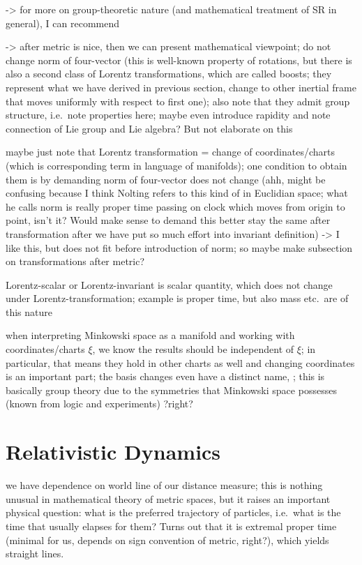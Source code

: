 -> for more on group-theoretic nature (and mathematical treatment of SR in general), I can recommend \cite{giulini_srt_indepth}



-> after metric is nice, then we can present mathematical viewpoint; do not change norm of four-vector (this is well-known property of rotations, but there is also a second class of Lorentz transformations, which are called boosts; they represent what we have derived in previous section, change to other inertial frame that moves uniformly with respect to first one); also note that they admit group structure, i.e.~note properties here; maybe even introduce rapidity and note connection of Lie group and Lie algebra? But not elaborate on this

maybe just note that Lorentz transformation = change of coordinates/charts (which is corresponding term in language of manifolds); one condition to obtain them is by demanding norm of four-vector does not change (ahh, might be confusing because I think Nolting refers to this kind of in Euclidian space; what he calls norm is really proper time passing on clock which moves from origin to point, isn't it? Would make sense to demand this better stay the same after transformation after we have put so much effort into invariant definition) -> I like this, but does not fit before introduction of norm; so maybe make subsection on transformations after metric?



Lorentz-scalar or Lorentz-invariant is scalar quantity, which does not change under Lorentz-transformation; example is proper time, but also mass etc.~are of this nature





when interpreting Minkowski space as a manifold and working with coordinates/charts $\xi$, we know the results should be independent of $\xi$; in particular, that means they hold in other charts as well and changing coordinates is an important part; the basis changes even have a distinct name, ; this is basically group theory due to the symmetries that Minkowski space possesses (known from logic and experiments) ?right?




\newpage



	\section{Relativistic Dynamics}
we have dependence on world line of our distance measure; this is nothing unusual in mathematical theory of metric spaces, but it raises an important physical question: what is the preferred trajectory of particles, i.e.~what is the time that usually elapses for them? Turns out that it is extremal proper time (minimal for us, depends on sign convention of metric, right?), which yields straight lines.


